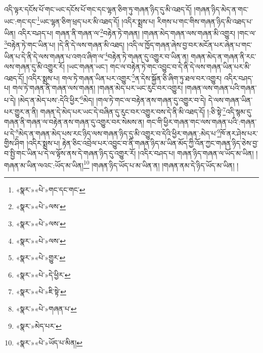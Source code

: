 འདི་ལྟར་དངོས་པོ་གང་ཡང་དངོས་པོ་གང་དང་ལྷན་ཅིག་ཏུ་གཞན་ཉིད་དུ་མི་འཐད་དོ། །གཞན་ཉིད་མེད་ན་གང་ཡང་:གང་དང་\footnote{«སྣར་»«པེ་»གང་དང་གང་}ཡང་ལྷན་ཅིག་ཕྲད་པར་མི་འཐད་དོ། །འདིར་སྨྲས་པ། རིགས་པ་གང་གིས་གཞན་ཉིད་མི་འཐད་པ་ཡིན། འདིར་བཤད་པ། གཞན་ནི་གཞན་ལ་\footnote{«སྣར་»«པེ་»ལས་}བརྟེན་ཏེ་གཞན། །གཞན་མེད་གཞན་ལས་གཞན་མི་འགྱུར། །གང་ལ་\footnote{«སྣར་»«པེ་»ལས་}བརྟེན་ཏེ་གང་ཡིན་པ། །དེ་ནི་དེ་ལས་གཞན་མི་འཐད། །འདི་ལ་ཁྱོད་གཞན་ཞེས་བྱ་བར་མངོན་པར་ཞེན་པ་གང་ཡིན་པ་དེ་ནི་དེ་ལས་གཞན་པ་འགའ་ཞིག་ལ་\footnote{«སྣར་»«པེ་»ལས་}བརྟེན་ཏེ་གཞན་དུ་འགྱུར་བ་ཡིན་ན། གཞན་མེད་ན་གཞན་ནི་རང་ལས་གཞན་དུ་མི་འགྱུར་རོ། །ཡང་གཞན་ཡང་། གང་ལ་བརྟེན་ཏེ་གང་འབྱུང་བ་དེ་ནི་དེ་ལས་གཞན་ཡིན་པར་མི་འཐད་དོ། །འདིར་སྨྲས་པ། གལ་ཏེ་གཞན་ཡིན་པར་འགྱུར་\footnote{«སྣར་»«པེ་»གྱུར་}ན་དེས་སྐྱོན་ཅི་ཞིག་ཏུ་ཐལ་བར་འགྱུར། འདིར་བཤད་པ། གལ་ཏེ་གཞན་ནི་གཞན་ལས་གཞན། །གཞན་མེད་པར་ཡང་རུང་བར་འགྱུར། །གཞན་ལས་གཞན་པའི་གཞན་པ་དེ། །མེད་ན་མེད་པས་:དེའི་ཕྱིར་\footnote{«སྣར་»«པེ་»དེ་ཕྱིར་}མེད། །གལ་ཏེ་གང་ལ་བརྟེན་ནས་གཞན་དུ་འགྱུར་བ་དེ། དེ་ལས་གཞན་ཡིན་པར་གྱུར་ན་ནི། གཞན་དེ་མེད་པར་ཡང་དེ་བཞིན་དུ་རུང་བར་འགྱུར་བས་དེ་ནི་མི་འཐད་དོ། །:ཅི་སྟེ་\footnote{«སྣར་»«པེ་»ཇི་སྟེ་}འདི་སྙམ་དུ་གཞན་ནི་གཞན་ལ་བརྟེན་ནས་གཞན་དུ་འགྱུར་བར་སེམས་ན། གང་གི་ཕྱིར་གཞན་གང་ལས་གཞན་པའི་:གཞན་པ་དེ་\footnote{«སྣར་»«པེ་»གཞན་པ་}མེད་ན་གཞན་མེད་པས་རང་ཉིད་ལས་གཞན་ཉིད་དུ་མི་འགྱུར་བ་དེའི་ཕྱིར་གཞན་:མེད་པ་\footnote{«སྣར་»མེད་པར་}ཁོ་ནར་ཤེས་པར་གྱིས་ཤིག །འདིར་སྨྲས་པ། རྟེན་ཅིང་འབྲེལ་པར་འབྱུང་བ་ནི་གཞན་ཉིད་མ་ཡིན་མོད་ཀྱི་འོན་ཀྱང་གཞན་ཉིད་ཅེས་བྱ་བ་སྤྱི་གང་ཡིན་པ་དེ་ལ་ལྟོས་ནས་དེ་གཞན་ཉིད་དུ་འགྱུར་རོ། །འདིར་བཤད་པ། གཞན་ཉིད་གཞན་ལ་ཡོད་མ་ཡིན། །གཞན་མ་ཡིན་ལའང་:ཡོད་མ་ཡིན།\footnote{«སྣར་»«པེ་»ཡོད་པ་མིན།} །གཞན་ཉིད་ཡོད་པ་མ་ཡིན་ན། །གཞན་ནམ་དེ་ཉིད་ཡོད་མ་ཡིན། །
